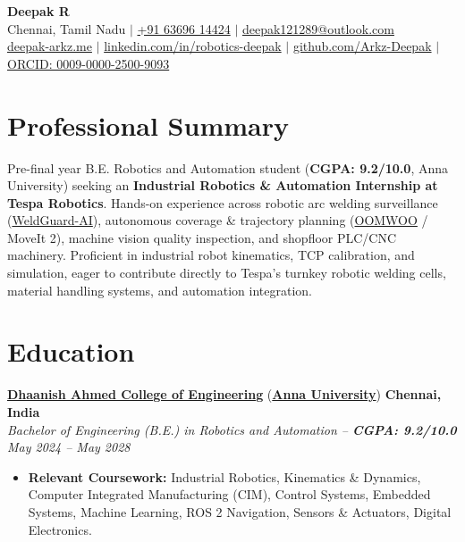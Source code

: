 \documentclass[letterpaper,10pt]{article}
\begin{document}
\begin{center}
    {\LARGE \textbf{Deepak R}} \\ \vspace{2.5pt}
    \small Chennai, Tamil Nadu $|$ \href{tel:+916369614424}{+91 63696 14424} $|$ \href{mailto:deepak121289@outlook.com}{deepak121289@outlook.com} \\ \vspace{2pt}
    \href{https://deepak-arkz.me}{deepak-arkz.me} $|$ 
    \href{https://linkedin.com/in/robotics-deepak}{linkedin.com/in/robotics-deepak} $|$ 
    \href{https://github.com/Arkz-Deepak}{github.com/Arkz-Deepak} $|$
    \href{https://orcid.org/0009-0000-2500-9093}{ORCID: 0009-0000-2500-9093}
\end{center}
\vspace{-6pt}

\section{Professional Summary}
\small{Pre-final year B.E. Robotics and Automation student (\textbf{CGPA: 9.2/10.0}, Anna University) seeking an \textbf{Industrial Robotics \& Automation Internship at Tespa Robotics}. Hands-on experience across robotic arc welding surveillance (\href{https://github.com/Arkz-Deepak/WeldGuard-AI}{WeldGuard-AI}), autonomous coverage \& trajectory planning (\href{https://github.com/Arkz-Deepak/oomwoo-clean-and-map-arkz}{OOMWOO} / MoveIt 2), machine vision quality inspection, and shopfloor PLC/CNC machinery. Proficient in industrial robot kinematics, TCP calibration, and simulation, eager to contribute directly to Tespa's turnkey robotic welding cells, material handling systems, and automation integration.}

\section{Education}
\noindent
\href{https://dhaanish.org}{\textbf{Dhaanish Ahmed College of Engineering}} (\href{https://www.annauniv.edu}{\textbf{Anna University}}) \hfill \textbf{Chennai, India} \\
\textit{Bachelor of Engineering (B.E.) in Robotics and Automation -- \textbf{CGPA: 9.2/10.0}} \hfill \textit{May 2024 -- May 2028} \\
\begin{itemize}
    \item \textbf{Relevant Coursework:} Industrial Robotics, Kinematics \& Dynamics, Computer Integrated Manufacturing (CIM), Control Systems, Embedded Systems, Machine Learning, ROS 2 Navigation, Sensors \& Actuators, Digital Electronics.
\end{itemize}
\end{document}
